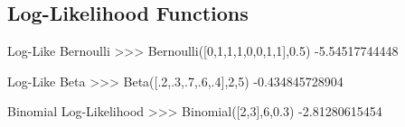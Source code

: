 \documentclass[a4paper,10pt,english]{sphinxmanual}
\begin{document}
\subsection{Log-Likelihood Functions}
\label{BIP.Bayes:log-likelihood-functions}\label{BIP.Bayes:module-BIP.Bayes.like}

\begin{fulllineitems}
\label{BIP.Bayes:BIP.Bayes.like.Bernoulli}
Log-Like Bernoulli
\textgreater{}\textgreater{}\textgreater{} Bernoulli({[}0,1,1,1,0,0,1,1{]},0.5)
-5.54517744448

\end{fulllineitems}


\begin{fulllineitems}
\label{BIP.Bayes:BIP.Bayes.like.Beta}
Log-Like Beta
\textgreater{}\textgreater{}\textgreater{} Beta({[}.2,.3,.7,.6,.4{]},2,5)
-0.434845728904

\end{fulllineitems}


\begin{fulllineitems}
\label{BIP.Bayes:BIP.Bayes.like.Binomial}
Binomial Log-Likelihood 
\textgreater{}\textgreater{}\textgreater{} Binomial({[}2,3{]},6,0.3)
-2.81280615454

\end{fulllineitems}

\end{document}
